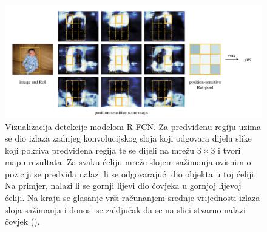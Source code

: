  \begin{figure}
	\centering
	\includegraphics[scale=0.7]{img/rfcn_vizualizacija.png}
	\caption{Vizualizacija detekcije modelom R-FCN. Za predviđenu regiju uzima se dio izlaza zadnjeg konvolucijskog sloja koji odgovara dijelu slike koji pokriva predviđena regija te se dijeli na mrežu $3 \times 3$ i tvori mapu rezultata. Za svaku ćeliju mreže slojem sažimanja ovisnim o poziciji se predviđa nalazi li se odgovarajući dio objekta u toj ćeliji. Na primjer, nalazi li se gornji lijevi dio čovjeka u gornjoj lijevoj ćeliji. Na kraju se glasanje vrši računanjem srednje vrijednosti izlaza sloja sažimanja i donosi se zaključak da se na slici stvarno nalazi čovjek (\cite{DBLP:journals/corr/DaiLHS16}).}
	\label{rfcn_vizualizacija}
\end{figure}